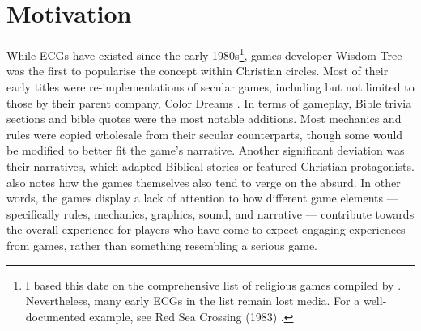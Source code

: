 \section{Motivation} %

While \acp{ECG} have existed since the early 1980s\footnote{I based this date on the comprehensive list of religious games compiled by \textcite{gonzalez_religious_2022}. Nevertheless, many early \acp{ECG} in the list remain lost media. For a well-documented example, see Red Sea Crossing (1983) \parencite{lucky_chorus_2023, goldfarb_holy_2012}.}, games developer Wisdom Tree was the first to popularise the concept within Christian circles. Most of their early titles were re-implementations of secular games, including but not limited to those by their parent company, Color Dreams \parencite[287]{bogost_persuasive_2007}. In terms of gameplay, Bible trivia sections and bible quotes were the most notable additions. Most mechanics and rules were copied wholesale from their secular counterparts, though some would be modified to better fit the game's narrative. Another significant deviation was their narratives, which adapted Biblical stories or featured Christian protagonists. \textcite[287]{bogost_persuasive_2007} also notes how the games themselves also tend to verge on the absurd. In other words, the games display a lack of attention to how different game elements --- specifically rules, mechanics, graphics, sound, and narrative --- contribute towards the overall experience for players who have come to expect engaging experiences from games, rather than something resembling a serious game.




